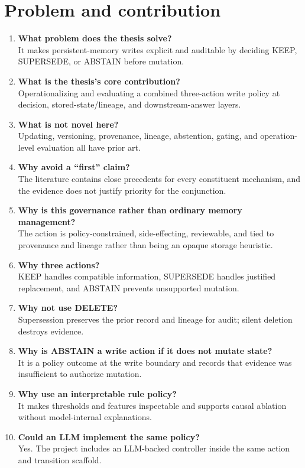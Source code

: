 \section{Problem and contribution}\label{problem-and-contribution}

\begin{enumerate}
\def\labelenumi{\arabic{enumi}.}
\item
  \textbf{What problem does the thesis solve?}\\
  It makes persistent-memory writes explicit and auditable by deciding
  KEEP, SUPERSEDE, or ABSTAIN before mutation.
\item
  \textbf{What is the thesis's core contribution?}\\
  Operationalizing and evaluating a combined three-action write policy
  at decision, stored-state/lineage, and downstream-answer layers.
\item
  \textbf{What is not novel here?}\\
  Updating, versioning, provenance, lineage, abstention, gating, and
  operation-level evaluation all have prior art.
\item
  \textbf{Why avoid a ``first'' claim?}\\
  The literature contains close precedents for every constituent
  mechanism, and the evidence does not justify priority for the
  conjunction.
\item
  \textbf{Why is this governance rather than ordinary memory
  management?}\\
  The action is policy-constrained, side-effecting, reviewable, and tied
  to provenance and lineage rather than being an opaque storage
  heuristic.
\item
  \textbf{Why three actions?}\\
  KEEP handles compatible information, SUPERSEDE handles justified
  replacement, and ABSTAIN prevents unsupported mutation.
\item
  \textbf{Why not use DELETE?}\\
  Supersession preserves the prior record and lineage for audit; silent
  deletion destroys evidence.
\item
  \textbf{Why is ABSTAIN a write action if it does not mutate state?}\\
  It is a policy outcome at the write boundary and records that evidence
  was insufficient to authorize mutation.
\item
  \textbf{Why use an interpretable rule policy?}\\
  It makes thresholds and features inspectable and supports causal
  ablation without model-internal explanations.
\item
  \textbf{Could an LLM implement the same policy?}\\
  Yes. The project includes an LLM-backed controller inside the same
  action and transition scaffold.
\end{enumerate}

